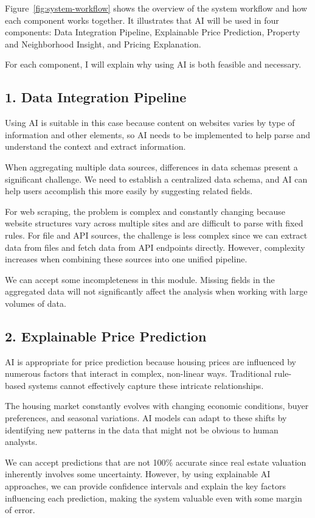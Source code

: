 Figure~\ref{fig:system-workflow} shows the overview of the system workflow and how each component works together. It illustrates that AI will be used in four components: Data Integration Pipeline, Explainable Price Prediction, Property and Neighborhood Insight, and Pricing Explanation.

For each component, I will explain why using AI is both feasible and necessary.

\subsection*{1. Data Integration Pipeline}
Using AI is suitable in this case because content on websites varies by type of information and other elements, so AI needs to be implemented to help parse and understand the context and extract information.

When aggregating multiple data sources, differences in data schemas present a significant challenge. We need to establish a centralized data schema, and AI can help users accomplish this more easily by suggesting related fields.

For web scraping, the problem is complex and constantly changing because website structures vary across multiple sites and are difficult to parse with fixed rules. For file and API sources, the challenge is less complex since we can extract data from files and fetch data from API endpoints directly. However, complexity increases when combining these sources into one unified pipeline.

We can accept some incompleteness in this module. Missing fields in the aggregated data will not significantly affect the analysis when working with large volumes of data.

\subsection*{2. Explainable Price Prediction}
AI is appropriate for price prediction because housing prices are influenced by numerous factors that interact in complex, non-linear ways. Traditional rule-based systems cannot effectively capture these intricate relationships.

The housing market constantly evolves with changing economic conditions, buyer preferences, and seasonal variations. AI models can adapt to these shifts by identifying new patterns in the data that might not be obvious to human analysts.

We can accept predictions that are not 100\% accurate since real estate valuation inherently involves some uncertainty. However, by using explainable AI approaches, we can provide confidence intervals and explain the key factors influencing each prediction, making the system valuable even with some margin of error.

